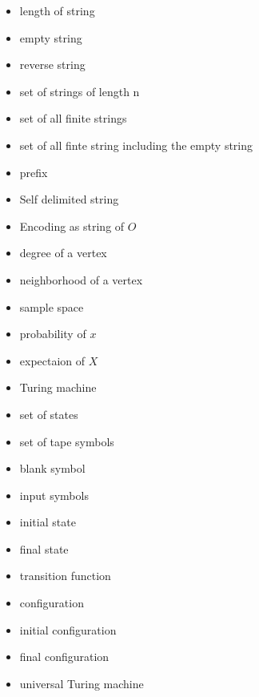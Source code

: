 \begin{itemize}[leftmargin=1.5cm]

\item [$l(s)$] length of string
\item [$\lambda$] empty string
\item [$s^R$] reverse string
\item [$\mathcal{S}^{n}$] set of strings of length n
\item [$\mathcal{S}^{+}$] set of all finite strings
\item [$\mathcal{S}^{\ast}$] set of all finte string including the empty string
\item [$<_p$] prefix
\item [$\bar{s}$] Self delimited string
\item [$\left\langle O\right\rangle$] Encoding as string of $O$


\item [$\deg(v)$] degree of a vertex
\item [$N(v)$] neighborhood of a vertex


\item[$\Omega$] sample space
\item[$P(x)$] probability of $x$
\item[$E(X)$] expectaion of $X$

%
%

\bigskip

\item [$T$] Turing machine
\item [$Q$] set of states
\item [$\Gamma$] set of tape symbols
\item [$\sqcup$] blank symbol
\item [$\Sigma$] input symbols
\item [$q_o$] initial state
\item [$q_f$] final state
\item [$\tau$] transition function
\item [$C$] configuration
\item [$C_o$] initial configuration
\item [$C_f$] final configuration
\item [$U$] universal Turing machine


\end{itemize}
